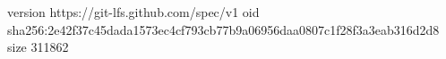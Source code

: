 version https://git-lfs.github.com/spec/v1
oid sha256:2e42f37c45dada1573ec4cf793cb77b9a06956daa0807c1f28f3a3eab316d2d8
size 311862
